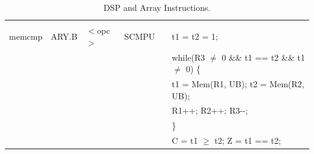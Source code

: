 \begin{table}
\begin{subtable}{\linewidth}
\begin{center}
\begin{tabular}{llllll}
                   &                   &                                       &                   &                   &                                                                               \\
memcmp             & ARY.B             & $<$opc$>$                             & SCMPU             & \flags{--!!}      & t1 = t2 = 1;                                                                  \\
                   &                   &                                       &                   &                   & while(R3 $\ne$ 0 \&\& t1 == t2 \&\& t1 $\ne$ 0) \{                            \\
                   &                   &                                       &                   &                   & \quad t1 = Mem(R1, UB); t2 = Mem(R2, UB);                                     \\
                   &                   &                                       &                   &                   & \quad R1++; R2++; R3-{}-;                                                     \\
                   &                   &                                       &                   &                   & \}                                                                            \\
                   &                   &                                       &                   &                   & C = t1 $\ge$ t2; Z = t1 == t2;                                                \\ \hline
\end{tabular}
\end{center}
\captionsetup{font=scriptsize, labelfont=scriptsize}
\caption{Array Instructions. T is the data type given by opcode suffix (.sz) -- B, W or L, with UB and UW
in place of B and W for SUNTIL and SWHILE. R3 = 0 does nothing. R1 and R2 are undefined after RMPA, SMOVU
and SCMPU. Maximum possible value for R3 for RMPA instruction is $2^{16}$.}
\end{subtable}
\captionsetup{font=scriptsize, labelfont=scriptsize}
\caption{DSP and Array Instructions.}
\end{table}




